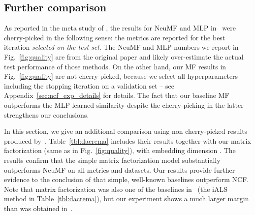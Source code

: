 \documentclass{article}
\begin{document}
\subsection{Further comparison}
\label{sec:non_cherry_picked}

As reported in the meta study of \cite{dacrema:arxiv2019}, the results for NeuMF and MLP in~\cite{he:www17} were cherry-picked in the following sense: the metrics are reported for the best iteration \emph{selected on the test set}.
The NeuMF and MLP numbers we report in Fig.~\ref{fig:quality} are from the original paper and likely over-estimate the actual test performance of those methods.
On the other hand, our MF results in Fig.~\ref{fig:quality} are not cherry picked, because we select all hyperparameters including the stopping iteration on a validation set -- see Appendix~\ref{sec:ncf_exp_details} for details.
The fact that our baseline MF outperforms the MLP-learned similarity despite the cherry-picking in the latter strengthens our conclusions.

In this section, we give an additional comparison using non cherry-picked results produced by~\cite{dacrema:arxiv2019}.
Table~\ref{tbl:dacrema} includes their results together with our matrix factorization (same as in Fig.~\ref{fig:quality}), with embedding dimension .
The results confirm that the simple matrix factorization model substantially outperforms NeuMF on all metrics and datasets.
Our results provide further evidence to the conclusion of \cite{dacrema:arxiv2019} that simple, well-known baselines outperform NCF.
Note that matrix factorization was also one of the baselines in~\cite{dacrema:arxiv2019}  (the iALS method in Table~\ref{tbl:dacrema}), but our experiment shows a much larger margin than was obtained in~\cite{dacrema:arxiv2019}.
\end{document}
